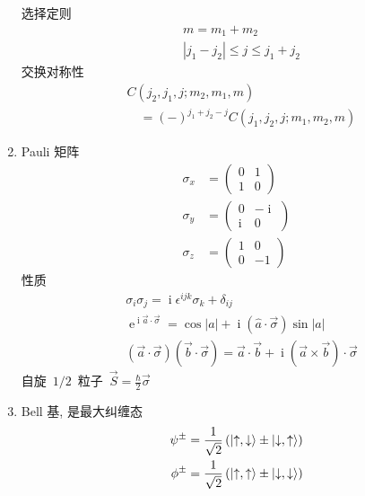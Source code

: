 \documentclass[11pt,a4paper,twocolumn,fleqn]{article}%
\DeclareMathOperator{\mi}{i}
\DeclareMathOperator{\e}{e}%
\renewcommand{\[}{~$}
\renewcommand{\]}{$~}%
\begin{document}
\begin{enumerate}
  	选择定则
  	\begin{align}
  	 &m=m_1 + m_2 \\
  	 &|j_1 - j_2|\le j \le j_1 + j_2
  	\end{align}
  	交换对称性
  	\begin{align}
  	 &C(j_2,j_1,j;m_2,m_1,m) \nonumber \\
  	 &\quad = (-)^{j_1 + j_2 - j}C(j_1,j_2,j;m_1,m_2,m)
  	\end{align}
  \item Pauli 矩阵
  	\begin{align}
  	 \sigma_x &= \begin{pmatrix}0 &1 \\ 1 &0\end{pmatrix}\\
  	 \sigma_y &= \begin{pmatrix}0 &-\mi \\ \mi &0\end{pmatrix}\\
  	 \sigma_z &= \begin{pmatrix}1 &0 \\ 0 &-1\end{pmatrix}
  	\end{align}
  	性质
  	\begin{align}
  	 &\sigma_i\sigma_j = \mi\epsilon^{ijk}\sigma_k + \delta_{ij}\\
  	 &\e^{\mi\vec a\cdot \vec\sigma} = \cos|a| + \mi(\hat a\cdot\vec\sigma)\sin|a| \\
  	 &(\vec a\cdot\vec\sigma)(\vec b\cdot\vec\sigma) = \vec a \cdot\vec b + \mi (\vec a\times\vec b)\cdot\vec\sigma
  	\end{align}
  	自旋\[1/2\]粒子\[\vec S = \frac{\hbar}{2}\vec\sigma\]
  \item Bell 基, 是最大纠缠态
  	\begin{align}
  	 \psi^\pm &= \frac{1}{\sqrt 2}\left(\ket{\uparrow,\downarrow} \pm \ket{\downarrow,\uparrow}\right)\\
  	 \phi^\pm &= \frac{1}{\sqrt 2}\left(\ket{\uparrow,\uparrow} \pm \ket{\downarrow,\downarrow}\right)
  	\end{align}
 \end{enumerate}
 
\end{document}
